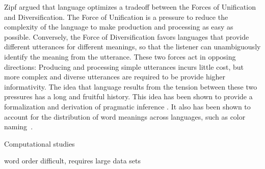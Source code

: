 \documentclass[9pt,twocolumn,twoside,lineno]{pnas-new}
\newcommand{\key}[1]{\textbf{#1}}
\begin{document}
Zipf \cite{zipf1949human} argued that language optimizes a tradeoff between the Forces of Unification and Diversification.
The Force of Unification is a pressure to reduce the complexity of the language to make production and processing as easy as possible.
Conversely, the Force of Diversification favors languages that provide different utterances for different meanings, so that the listener can unambiguously identify the meaning from the utterance.
These two forces act in opposing directions:
Producing and processing simple utterances incurs little cost, but more complex and diverse utterances are required to be provide higher informativity.
The idea that language results from the tension between these two pressures has a long and fruitful history.
%
%
%
This idea has been shown to provide a formalization and derivation of pragmatic inference \cite{horn-toward-1984, frank2012predicting}.
It also has been shown to account for the distribution of word meanings across languages, such as color naming~\cite{zaslavsky2018efficient}.




%

%
%




Computational studies

word order difficult, requires large data sets
\end{document}
